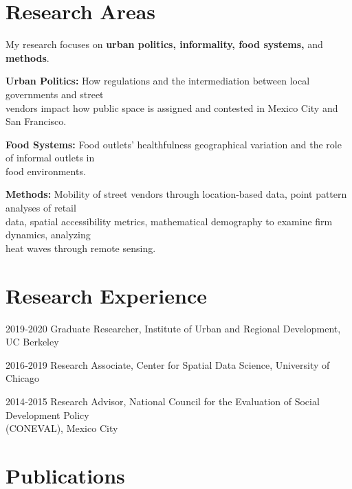 \documentclass[12pt,letterpaper]{report}
\newcommand{\listitemspace}{0.25em}
\renewenvironment{itemize}
{\begin{list}{}{\setlength{\leftmargin}{0em}
                \setlength{\parskip}{0em}
                \setlength{\itemsep}{\listitemspace}
                \setlength{\parsep}{\listitemspace}}}
{\end{list}}
\begin{document}
    \section*{Research Areas}
    \begin{itemize}
\item My research focuses on \textbf{urban politics, informality, food systems,} and \textbf{methods}.

\subitem \textbf{Urban Politics:} How regulations and the intermediation between local governments and street \\
\hspace{1.5em} vendors impact how public space is assigned and contested in Mexico City and San Francisco.

\subitem \textbf{Food Systems:} Food outlets’ healthfulness geographical variation and the role of informal outlets in \\
\hspace{1.5em} food environments.

\subitem \textbf{Methods:}  Mobility of street vendors through location-based data, point pattern analyses of retail\\
\hspace{1.5em} data, spatial accessibility metrics,  mathematical demography to examine firm dynamics, analyzing \\
\hspace{1.5em} heat waves through remote sensing. 
    \end{itemize}
    
    \section*{Research Experience}
    \begin{tablist}
        \item[2019‐2020] \quad{}Graduate Researcher, Institute of Urban and Regional Development, UC Berkeley
        \item[2016‐2019] \quad{}Research Associate, Center for Spatial Data Science, University of Chicago
        \item[2014‐2015] \quad{}Research Advisor, National Council for the Evaluation of Social Development Policy \\
        \hspace{1em}(CONEVAL), Mexico City
    \end{tablist}

    \section*{Publications}
\end{document}
